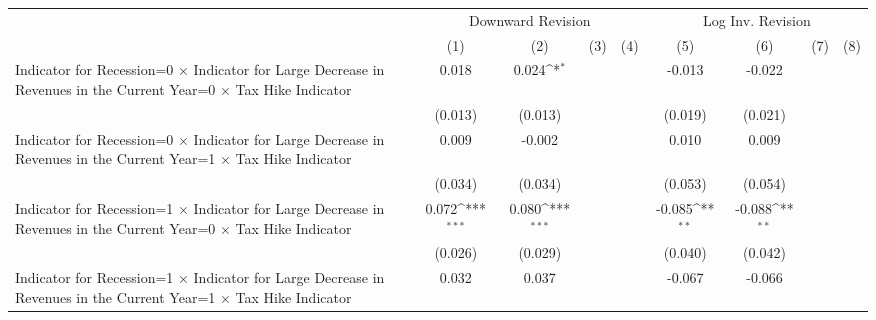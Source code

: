 {
\def\sym#1{\ifmmode^{#1}\else\(^{#1}\)\fi}
\begin{tabular}{l*{8}{c}}
\toprule
                    &\multicolumn{4}{c}{Downward Revision}                                                  &\multicolumn{4}{c}{Log Inv. Revision}                                                  \\\cmidrule(lr){2-5}\cmidrule(lr){6-9}
                    &\multicolumn{1}{c}{(1)}         &\multicolumn{1}{c}{(2)}         &\multicolumn{1}{c}{(3)}         &\multicolumn{1}{c}{(4)}         &\multicolumn{1}{c}{(5)}         &\multicolumn{1}{c}{(6)}         &\multicolumn{1}{c}{(7)}         &\multicolumn{1}{c}{(8)}         \\
\midrule
Indicator for Recession=0 $\times$ Indicator for Large Decrease in Revenues in the Current Year=0 $\times$ Tax Hike Indicator&       0.018         &       0.024\sym{*}  &                     &                     &      -0.013         &      -0.022         &                     &                     \\
                    &     (0.013)         &     (0.013)         &                     &                     &     (0.019)         &     (0.021)         &                     &                     \\
Indicator for Recession=0 $\times$ Indicator for Large Decrease in Revenues in the Current Year=1 $\times$ Tax Hike Indicator&       0.009         &      -0.002         &                     &                     &       0.010         &       0.009         &                     &                     \\
                    &     (0.034)         &     (0.034)         &                     &                     &     (0.053)         &     (0.054)         &                     &                     \\
Indicator for Recession=1 $\times$ Indicator for Large Decrease in Revenues in the Current Year=0 $\times$ Tax Hike Indicator&       0.072\sym{***}&       0.080\sym{***}&                     &                     &      -0.085\sym{**} &      -0.088\sym{**} &                     &                     \\
                    &     (0.026)         &     (0.029)         &                     &                     &     (0.040)         &     (0.042)         &                     &                     \\
Indicator for Recession=1 $\times$ Indicator for Large Decrease in Revenues in the Current Year=1 $\times$ Tax Hike Indicator&       0.032         &       0.037         &                     &                     &      -0.067         &      -0.066         &                     &                     \\

\end{tabular}}
